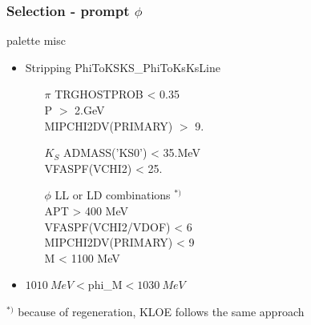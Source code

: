 \documentclass{beamer}
\begin{document}
\LogoOff
\begin{frame}[fragile]
\frametitle{Selection - prompt $\phi$}

\begin{beamercolorbox}[rounded=true,shadow=true]{palette misc}
\begin{itemize}
\item Stripping PhiToKSKS_PhiToKsKsLine
\begin{itemize}
\item[$\pi$] 
TRGHOSTPROB < 0.35\\
P $>$ 2.GeV\\
MIPCHI2DV(PRIMARY) $>$ 9.\\
\item[$K_S$]ADMASS('KS0') < 35.MeV\\
VFASPF(VCHI2) < 25.\\
\item[$\phi$]LL or LD combinations $^{*)}$\\
APT > 400 MeV\\
VFASPF(VCHI2/VDOF) < 6\\
MIPCHI2DV(PRIMARY) < 9\\
M < 1100 MeV\\
\end{itemize}
\item $\SI{1010}{MeV}<$phi_M$<\SI{1030}{MeV}$
\end{itemize}
\end{beamercolorbox}
$^{*)}$ because of regeneration, KLOE follows the same approach



\end{frame}
\LogoOn
\end{document}
